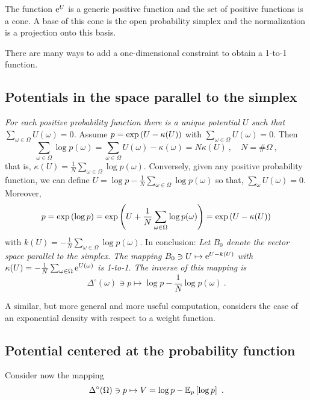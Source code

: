 \documentclass[12pt,a4paper]{amsart}
\theoremstyle{plain}%
\theoremstyle{definition}
\theoremstyle{remark}
\begin{document}
The function $\mathrm{e}^U$ is a generic positive function and the set of positive functions is a cone. A base of this cone is the open probability simplex and the normalization is a projection onto this basis.

There are many ways to add a one-dimensional constraint to obtain a 1-to-1 function. 

\subsection{Potentials in the space parallel to the simplex}

\emph{For each positive probability function there is a unique potential $U$ such that $\sum_{\omega \in \Omega} U(\omega) = 0$.} Assume $p = \exp\left(U - \kappa(U)\right)$ with $\sum_{\omega \in \Omega} U(\omega) = 0$. Then
\begin{equation*}
  \sum_{\omega\in\Omega} \log p(\omega) = \sum_{\omega \in \Omega} U(\omega) - \kappa(\omega) = N \kappa(U) \ , \quad N = \# \Omega \ ,
\end{equation*}
that is, $\kappa(U) = \frac1N \sum_{\omega\in\Omega} \log p(\omega)$. Conversely, given any positive probability function, we can define $U = \log p - \frac1N \sum_{\omega\in\Omega} \log p(\omega)$ so that, $\sum_{\omega} U(\omega) = 0$. Moreover,
\begin{equation*}
  p = \exp\left(\log p\right) = \exp\left(U + \frac1N \sum_{\omega\in\Omega} \log p(\omega)\right) = \exp\left(U - \kappa(U)\right) 
\end{equation*}
with $k(U) = - \frac1N \sum_{\omega\in\Omega} \log p(\omega)$. In conclusion: \emph{Let $B_0$ denote the vector space parallel to the simplex. The mapping $B_0 \ni U \mapsto \mathrm{e}^{U-k(U)}$ with $\kappa(U) = - \frac1N \sum_{\omega\in\Omega} \mathrm{e}^{U(\omega)}$ is 1-to-1. The inverse of this mapping is}
  \begin{equation*}
    \Delta^\circ(\omega) \ni p\mapsto \log p - \frac1N \log p(\omega) \ .
  \end{equation*}

A similar, but more general and more useful computation, considers the case of an exponential density with respect to a weight function.

  \subsection{Potential centered at the probability function}
\label{sec:potent-cent-at}

Consider now the mapping
\begin{equation*}
  \Delta^\circ(\Omega) \ni p \mapsto V = \log p - \operatorname{\mathbb E}_{p}\left[\log p\right] \ .
\end{equation*}
\end{document}
